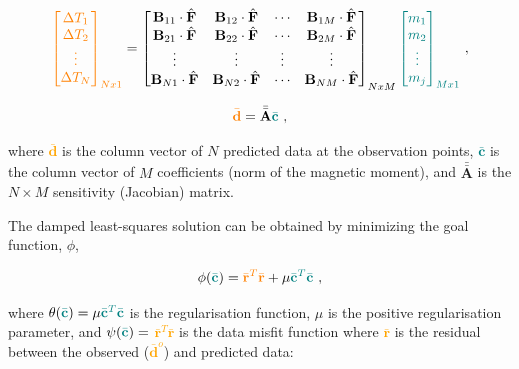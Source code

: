 \begin{equation}
\textcolor{orange}{\begin{bmatrix}
    \Delta T_1 \\ \Delta T_2 \\ \vdots \\ \Delta T_N
\end{bmatrix}_{Nx1}} = \begin{bmatrix}
    \mathbf{B}_{11} \cdot \hat{\mathbf{F}} & \mathbf{B}_{12} \cdot \hat{\mathbf{F}} & \cdots & \mathbf{B}_{1M} \cdot \hat{\mathbf{F}} \\
    \mathbf{B}_{21} \cdot \hat{\mathbf{F}} & \mathbf{B}_{22} \cdot \hat{\mathbf{F}} & \cdots & \mathbf{B}_{2M} \cdot \hat{\mathbf{F}} \\
    \vdots & \vdots & \vdots & \vdots \\
    \mathbf{B}_{N1} \cdot \hat{\mathbf{F}} & \mathbf{B}_{N2} \cdot \hat{\mathbf{F}} & \cdots & \mathbf{B}_{NM} \cdot \hat{\mathbf{F}} \\
\end{bmatrix}_{NxM} \textcolor{teal}{\begin{bmatrix}
    m_1 \\ m_2 \\ \vdots \\ m_j
\end{bmatrix}_{Mx1}} \ ,
\end{equation}

\begin{equation}
    \textcolor{orange}{\bar{\mathbf{d}}} = \bar{\bar{\mathbf{A}}} \textcolor{teal}{\bar{\mathbf{c}}}
    \ ,
\end{equation}

\noindent
where \textcolor{orange}{$\bar{\mathbf{d}}$} is the column vector of $N$ predicted data at the observation points, \textcolor{teal}{$\bar{\mathbf{c}}$} is the column vector of $M$ coefficients (norm of the magnetic moment), and $\bar{\bar{\mathbf{A}}}$ is the $N \times M$ sensitivity (Jacobian) matrix.


The damped least-squares solution can be obtained by minimizing the goal function, $\phi$,

\begin{equation}
\label{eq:goal_function}
    \phi(\textcolor{teal}{\bar{\mathbf{c}}}) = \textcolor{orange}{\bar{\mathbf{r}}^T\bar{\mathbf{r}}} + \mu \textcolor{teal}{\bar{\mathbf{c}}^T\bar{\mathbf{c}}}
    \ ,
\end{equation}

\noindent
where $\theta(\textcolor{teal}{\bar{\mathbf{c}}}) = \mu \textcolor{teal}{\bar{\mathbf{c}}^T\bar{\mathbf{c}}}$ is the regularisation function, $\mu$ is the positive regularisation parameter, and $\psi(\textcolor{teal}{\bar{\mathbf{c}}}) =$ \textcolor{orange}{$\bar{\mathbf{r}}^T\bar{\mathbf{r}}$} is the data misfit function where \textcolor{orange}{$\bar{\mathbf{r}}$} is the residual between the observed (\textcolor{orange}{$\bar{\mathbf{d}}^o$}) and predicted data:

